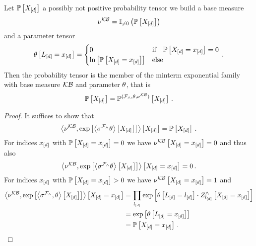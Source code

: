 \begin{theorem}
    \label{the:mintermExpressivityHLN}
    Let $\mathbb{P}\left[X_{[d]}\right]$ a possibly not positive probability tensor we build a base measure
    \[ \nu^{\mathcal{KB}} = \mathbb{I}_{\neq0}\left(\mathbb{P}\left[X_{[d]}\right]\right) \]
    and a parameter tensor
    \begin{align*}
        \theta\left[L_{[d]}=x_{[d]}\right]
        = \begin{cases}
              0 & \text{if} \quad \mathbb{P}\left[X_{[d]}=x_{[d]}\right] = 0  \\
              \ln \left[ \mathbb{P}\left[X_{[d]}=x_{[d]}\right] \right] & \text{else}
        \end{cases} \, .
    \end{align*}
    Then the probability tensor is the member of the minterm exponential family with base measure $\mathcal{KB}$ and parameter $\theta$, that is
    \[ \mathbb{P}\left[X_{[d]}\right] = \mathbb{P}^{(\mathcal{F}_{\land},\theta,\nu^{\mathcal{KB}})}\left[X_{[d]}\right] \, . \]
\end{theorem}
\begin{proof}
    It suffices to show that
    \[ \left\langle \nu^{\mathcal{KB}}, \mathrm{exp}\left[\left\langle 
        \sigma^{\mathcal{F}_{\land}}\theta
    \right\rangle \left[ 
        X_{[d]}
     \right]\right]\right\rangle \left[ X_{[d]} \right] = \mathbb{P}\left[X_{[d]}\right] \, . \]
    For indices $x_{[d]}$ with $\mathbb{P}\left[X_{[d]}=x_{[d]}\right]=0$ we have $\nu^{\mathcal{KB}}\left[X_{[d]}=x_{[d]}\right]=0$ and thus also
    \[ \left\langle \nu^{\mathcal{KB}}, \mathrm{exp}\left[\left\langle 
        \sigma^{\mathcal{F}_{\land}}\theta
    \right\rangle \left[ 
        X_{[d]}
     \right]\right]\right\rangle \left[ X_{[d]}=x_{[d]} \right] = 0 \, . \]
    For indices $x_{[d]}$ with $\mathbb{P}\left[X_{[d]}=x_{[d]}\right]>0$ we have $\nu^{\mathcal{KB}}\left[X_{[d]}=x_{[d]}\right]=1$ and
    \begin{align*}
        \left\langle \nu^{\mathcal{KB}}, \mathrm{exp}\left[\left\langle 
            \sigma^{\mathcal{F}_{\land}},\theta
        \right\rangle \left[ 
            X_{[d]}
         \right]\right]\right\rangle \left[ X_{[d]}=x_{[d]} \right]
        &= \prod_{l_{[d]}} \mathrm{exp}\left[\theta\left[L_{[d]}=l_{[d]}\right] \cdot Z^{\land}_{l_{[d]}}\left[X_{[d]}=x_{[d]}\right]\right] \\
        &=  \mathrm{exp}\left[\theta\left[L_{[d]}=x_{[d]}\right]\right] \\
        &=  \mathbb{P}\left[X_{[d]}=x_{[d]}\right] \, .
    \end{align*}
\end{proof}



